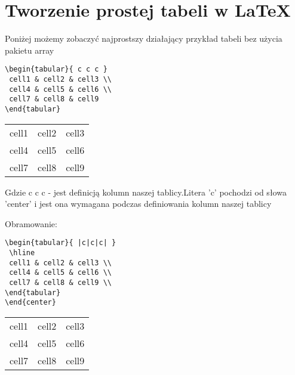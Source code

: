 \documentclass{beamer}
\begin{document}
\section{Tworzenie prostej tabeli w LaTeX}
\begin{frame}[fragile]
 
Poniżej możemy zobaczyć najprostszy działający przykład tabeli bez użycia pakietu array

\begin{lstlisting}
\begin{tabular}{ c c c }
 cell1 & cell2 & cell3 \\ 
 cell4 & cell5 & cell6 \\  
 cell7 & cell8 & cell9    
\end{tabular}
\end{lstlisting}

\begin{center}
\begin{tabular}{ c c c }
 cell1 & cell2 & cell3 \\ 
 cell4 & cell5 & cell6 \\  
 cell7 & cell8 & cell9    
\end{tabular}
\end{center} 

Gdzie { c c c } - jest definicją kolumn naszej tablicy.Litera 'c' pochodzi od słowa 'center' i jest ona wymagana podczas definiowania kolumn naszej tablicy
 
\end{frame}

\begin{frame}[fragile]

Obramowanie:
\begin{lstlisting}
\begin{tabular}{ |c|c|c| } 
 \hline
 cell1 & cell2 & cell3 \\ 
 cell4 & cell5 & cell6 \\ 
 cell7 & cell8 & cell9 \\ 
\end{tabular}
\end{center}
\end{lstlisting}

\begin{center}
\begin{tabular}{ |c|c|c| } 
 \hline
 cell1 & cell2 & cell3 \\ 
 cell4 & cell5 & cell6 \\ 
 cell7 & cell8 & cell9 \\ 
\end{tabular}
\end{center}
\end{frame}
\end{document}
